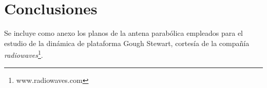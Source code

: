 \documentclass[techreport]{IEEEtran}
\begin{document}
\section{Conclusiones}






\appendix

Se incluye como anexo los planos de la antena parabólica empleados para el 
estudio de la dinámica
de plataforma Gough Stewart, cortesía de la compañía \emph{radiowaves}\footnote{www.radiowaves.com}.






% 
\end{document}
